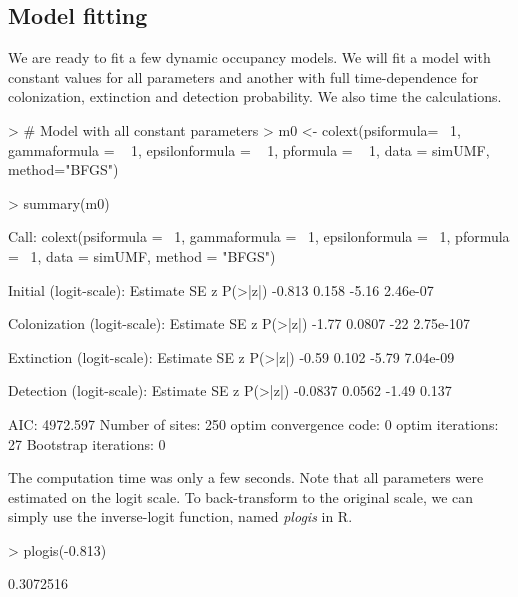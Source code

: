 \documentclass[12pt]{article}
\renewenvironment{Schunk}{\vspace{\topsep}}{\vspace{\topsep}}
\begin{document}
\subsection{Model fitting}
We are ready to fit a few dynamic occupancy models.
We will fit a model with constant values for all parameters and
another with full time-dependence for colonization, extinction and
detection probability. We also time the calculations.

\begin{small}

\begin{Schunk}
\begin{Sinput}
> # Model with all constant parameters
> m0 <- colext(psiformula= ~1, gammaformula = ~ 1, epsilonformula = ~ 1,
              pformula = ~ 1, data = simUMF, method="BFGS")
\end{Sinput}
\end{Schunk}

\begin{Schunk}
\begin{Sinput}
> summary(m0)
\end{Sinput}
\begin{Soutput}
Call:
colext(psiformula = ~1, gammaformula = ~1, epsilonformula = ~1, 
    pformula = ~1, data = simUMF, method = "BFGS")

Initial (logit-scale):
 Estimate    SE     z  P(>|z|)
   -0.813 0.158 -5.16 2.46e-07

Colonization (logit-scale):
 Estimate     SE   z   P(>|z|)
    -1.77 0.0807 -22 2.75e-107

Extinction (logit-scale):
 Estimate    SE     z  P(>|z|)
    -0.59 0.102 -5.79 7.04e-09

Detection (logit-scale):
 Estimate     SE     z P(>|z|)
  -0.0837 0.0562 -1.49   0.137

AIC: 4972.597 
Number of sites: 250
optim convergence code: 0
optim iterations: 27 
Bootstrap iterations: 0 
\end{Soutput}
\end{Schunk}

\end{small}


The computation time was only a few seconds.
Note that all parameters were estimated on the logit scale. To
back-transform to the original scale, we can simply use the
inverse-logit function, named \emph{plogis} in R.

\begin{small}

\begin{Schunk}
\begin{Sinput}
> plogis(-0.813)
\end{Sinput}
\begin{Soutput}
[1] 0.3072516
\end{Soutput}
\end{Schunk}
\end{small}
\end{document}
